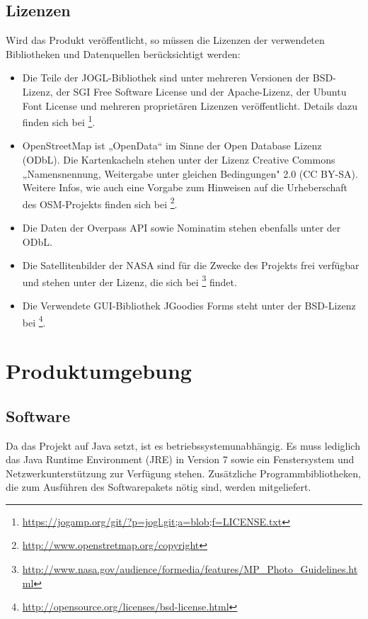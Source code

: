 \documentclass[10pt]{scrreprt}
\begin{document}
\pagebreak
\section{Lizenzen}
Wird das Produkt veröffentlicht, so müssen die Lizenzen der verwendeten Bibliotheken und Datenquellen berücksichtigt werden:
\begin{itemize}
\item Die Teile der JOGL-Bibliothek sind unter mehreren Versionen der BSD-Lizenz, der SGI Free Software License und der Apache-Lizenz, der Ubuntu Font License und mehreren proprietären Lizenzen veröffentlicht. Details dazu finden sich bei  \footnote{\url{https://jogamp.org/git/?p=jogl.git;a=blob;f=LICENSE.txt}}.
\item OpenStreetMap ist „OpenData“ im Sinne der Open Database Lizenz (ODbL). Die Kartenkacheln stehen unter der Lizenz  Creative Commons „Namensnennung, Weitergabe unter gleichen Bedingungen" 2.0 (CC BY-SA). Weitere Infos, wie auch eine Vorgabe zum Hinweisen auf die Urheberschaft des OSM-Projekts finden sich bei \footnote{\url{http://www.openstretmap.org/copyright}}.
\item Die Daten der Overpass API sowie Nominatim stehen ebenfalls unter der ODbL.
\item Die Satellitenbilder der NASA sind für die Zwecke des Projekts frei verfügbar und stehen unter der Lizenz, die sich bei \footnote{\url{http://www.nasa.gov/audience/formedia/features/MP_Photo_Guidelines.html}} findet.
\item Die Verwendete GUI-Bibliothek JGoodies Forms steht unter der BSD-Lizenz bei \footnote{\url{http://opensource.org/licenses/bsd-license.html}}.
\end{itemize}




\chapter{Produktumgebung}
\section{Software}
Da das Projekt auf Java setzt, ist es betriebssystemunabhängig. Es muss lediglich das Java Runtime Environment (JRE) in Version 7 sowie ein Fenstersystem und Netzwerkunterstützung zur Verfügung stehen. Zusätzliche Programmbibliotheken, die zum Ausführen des Softwarepakets nötig sind, werden mitgeliefert.\\
\end{document}
